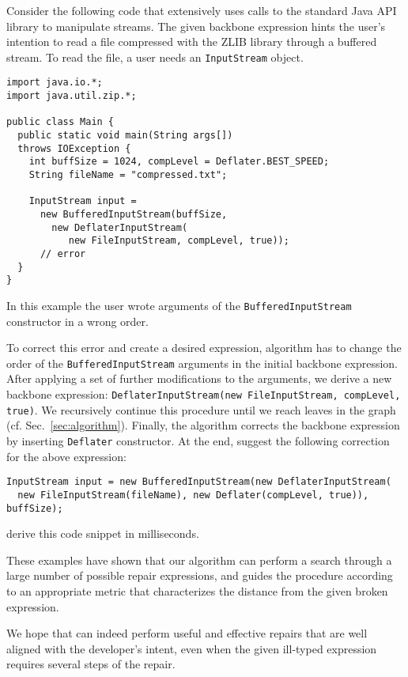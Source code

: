 Consider the following code that extensively uses
calls to the standard Java API library to manipulate streams.
The given backbone expression hints the user's intention to read a file 
compressed with the ZLIB library through a buffered stream.
To read the file, a user needs an \lstinline{InputStream} object.
\begin{lstlisting}
import java.io.*;
import java.util.zip.*;

public class Main {
  public static void main(String args[]) 
  throws IOException {
    int buffSize = 1024, compLevel = Deflater.BEST_SPEED;
    String fileName = "compressed.txt";
    
    InputStream input = 
      new BufferedInputStream(buffSize,
        new DeflaterInputStream(
           new FileInputStream, compLevel, true)); 
      // error
  }
}
\end{lstlisting}

In this example the user wrote arguments of 
the \lstinline{BufferedInputStream} constructor in a wrong order.

To correct this error and create a desired expression, 
\ourTool algorithm has to change the order of
the \lstinline{BufferedInputStream} arguments in the initial backbone expression.
After applying a set of further modifications to the arguments, we derive 
a new backbone expression: 
\lstinline{DeflaterInputStream(new FileInputStream, compLevel, true)}.
We recursively continue this procedure until we reach leaves in the
\ourTool graph (cf. Sec.~\ref{sec:algorithm}). Finally, the algorithm corrects the backbone expression
by inserting \lstinline{Deflater} constructor. At the end, \ourTool suggest the following correction for the above expression:
\begin{lstlisting}    
InputStream input = new BufferedInputStream(new DeflaterInputStream(
  new FileInputStream(fileName), new Deflater(compLevel, true)), buffSize);
\end{lstlisting}
\ourTool derive this code snippet in  milliseconds. 

These examples have shown that our algorithm can perform a search through a large number of
possible repair expressions, and guides the procedure according to an appropriate metric
that characterizes the distance from the given broken expression.

We hope that \ourTool can indeed perform useful
and effective repairs that are well aligned with the developer's intent, even when
 the given ill-typed expression requires several steps of the repair.  





